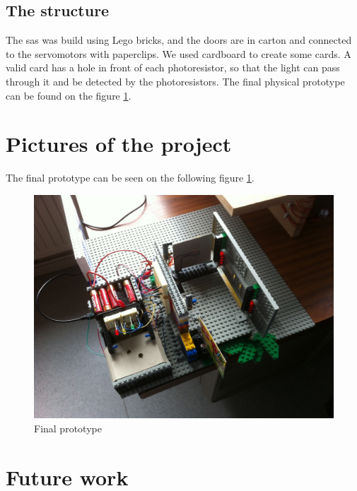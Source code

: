 \subsection{The structure}
The sas was build using Lego bricks, and the doors are in carton and connected to the servomotors with paperclips. We used cardboard to create some cards. A valid card has a hole in front of each photoresistor, so that the light can pass through it and be detected by the photoresistors. The final physical prototype can be found on the figure \ref{finalPrototype}.




\newpage
\section{Pictures of the project}
The final prototype can be seen on the following figure \ref{finalPrototype}.
\begin{figure}[!h]
	\includegraphics[scale=0.18]{photo1}
    \caption{Final prototype}
    \label{finalPrototype}
\end{figure}

\section{Future work}

